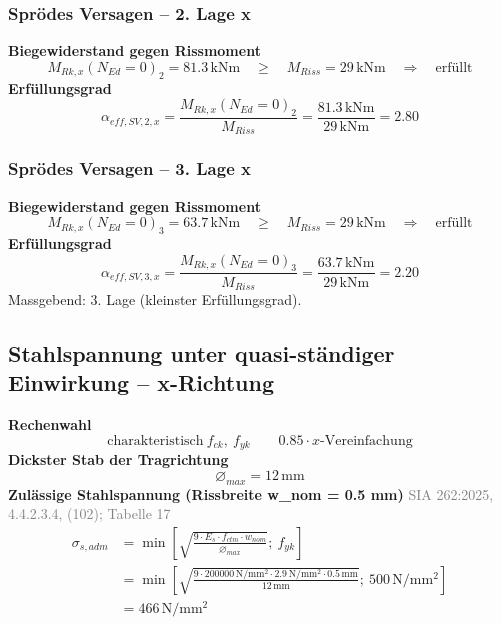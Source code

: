 \documentclass[11pt,a4paper]{article}
\newcommand{\normref}[1]{{\small\textcolor{gray}{#1}}}
\begin{document}
\subsubsection{Sprödes Versagen – 2. Lage x}
\noindent\textbf{Biegewiderstand gegen Rissmoment}
\begin{equation*}
M_{Rk,x}(N_{Ed} = 0)_{2} = 81.3\,\mathrm{kNm} \quad \ge \quad M_{Riss} = 29\,\mathrm{kNm} \quad \Rightarrow \quad \text{erfüllt}
\end{equation*}
\noindent\textbf{Erfüllungsgrad}
\begin{equation*}
\alpha_{eff,SV,2,x} = \frac{M_{Rk,x}(N_{Ed} = 0)_{2}}{M_{Riss}} = \frac{81.3\,\mathrm{kNm}}{29\,\mathrm{kNm}} = 2.80
\end{equation*}
\subsubsection{Sprödes Versagen – 3. Lage x}
\noindent\textbf{Biegewiderstand gegen Rissmoment}
\begin{equation*}
M_{Rk,x}(N_{Ed} = 0)_{3} = 63.7\,\mathrm{kNm} \quad \ge \quad M_{Riss} = 29\,\mathrm{kNm} \quad \Rightarrow \quad \text{erfüllt}
\end{equation*}
\noindent\textbf{Erfüllungsgrad}
\begin{equation*}
\alpha_{eff,SV,3,x} = \frac{M_{Rk,x}(N_{Ed} = 0)_{3}}{M_{Riss}} = \frac{63.7\,\mathrm{kNm}}{29\,\mathrm{kNm}} = 2.20
\end{equation*}
Massgebend: 3. Lage (kleinster Erfüllungsgrad).

\subsection{Stahlspannung unter quasi-ständiger Einwirkung – x-Richtung}
\noindent\textbf{Rechenwahl}
\begin{equation*}
\text{charakteristisch}\ f_{ck},\ f_{yk} \qquad 0.85 \cdot x\text{-Vereinfachung}
\end{equation*}
\noindent\textbf{Dickster Stab der Tragrichtung}
\begin{equation*}
\varnothing_{max} = 12\,\mathrm{mm}
\end{equation*}
\noindent\textbf{Zulässige Stahlspannung (Rissbreite w\_nom = 0.5 mm)} \hfill \normref{SIA 262:2025, 4.4.2.3.4, (102); Tabelle 17}
\begin{equation*}
\begin{aligned}
  \sigma_{s,adm} &= \min\left[\sqrt{\frac{9 \cdot E_s \cdot f_{ctm} \cdot w_{nom}}{\varnothing_{max}}};\ f_{yk}\right] \\
  &= \min\left[\sqrt{\frac{9 \cdot 200000\,\mathrm{N}/\mathrm{mm}^{2} \cdot 2.9\,\mathrm{N}/\mathrm{mm}^{2} \cdot 0.5\,\mathrm{mm}}{12\,\mathrm{mm}}};\ 500\,\mathrm{N}/\mathrm{mm}^{2}\right] \\
  &= 466\,\mathrm{N}/\mathrm{mm}^{2}
\end{aligned}
\end{equation*}
\end{document}
